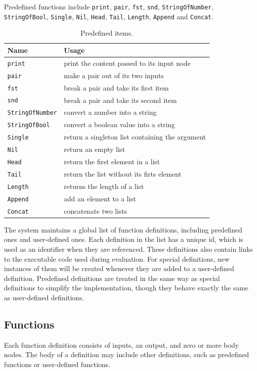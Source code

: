 \documentclass[12pt,UTF8,a4]{article}
\newcommand{\code}[1]{\texttt{#1}}
\begin{document}
Predefined functions include \code{print}, \code{pair}, \code{fst},
\code{snd}, \code{StringOfNumber}, \code{StringOfBool}, \code{Single},
\code{Nil}, \code{Head}, \code{Tail}, \code{Length}, \code{Append} and
\code{Concat}.
\begin{table}[!ht]
\center
\begin{tabular}{l|l}
\hline
Name & Usage \\
\hline
\code{print} & print the content passed to its input node\\
\code{pair} & make a pair out of its two inputs\\
\code{fst} & break a pair and take its first item \\
\code{snd} & break a pair and take its second item \\
\code{StringOfNumber} & convert a number into a string\\
\code{StringOfBool} & convert a boolean value into a string \\
\code{Single} & return a singleton list containing the argument \\
\code{Nil} & return an empty list \\
\code{Head} & return the first element in a list\\
\code{Tail} & return the list without its firts element\\
\code{Length} & returns the length of a list\\
\code{Append} & add an element to a list \\
\code{Concat} & concatenate two lists \\
\hline
\end{tabular}
\caption{Predefined items.}\label{tab:pitems}
\end{table}

The system maintains a global list of function definitions, including
predefined ones and user-defined ones. Each definition in the list has
a unique id, which is used as an identifier when they are
referenced. These definitions also contain links to the executable
code used during evaluation. For special definitions, new instances of
them will be created whenever they are added to a user-defined
definition. Predefined definitions are treated in the same way as
special definitions to simplify the implementation, though they behave
exactly the same as user-defined definitions.

\subsection{Functions}
Each function definition consists of inputs, an output, and zero or
more body nodes. The body of a definition may include other
definitions, such as predefined functions or user-defined functions.
\end{document}

